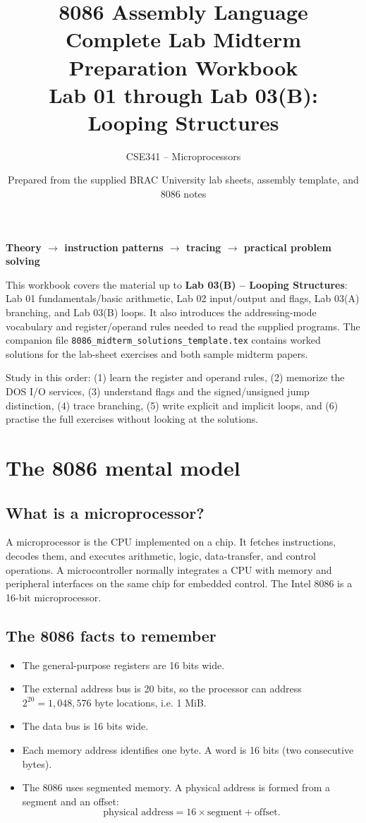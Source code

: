 \documentclass[11pt,a4paper]{article}
\title{\Huge\bfseries 8086 Assembly Language\\[3pt]\Large Complete Lab Midterm Preparation Workbook\\[5pt]\normalsize Lab 01 through Lab 03(B): Looping Structures}
\author{CSE341 -- Microprocessors}
\date{Prepared from the supplied BRAC University lab sheets, assembly template, and 8086 notes}
\begin{document}
\maketitle
\begin{center}\large\textbf{Theory $\rightarrow$ instruction patterns $\rightarrow$ tracing $\rightarrow$ practical problem solving}\end{center}
\begin{tcolorbox}[colback=navy!5,colframe=navy,title=Scope and how to use this workbook]
This workbook covers the material up to \textbf{Lab 03(B) -- Looping Structures}: Lab 01 fundamentals/basic arithmetic, Lab 02 input/output and flags, Lab 03(A) branching, and Lab 03(B) loops. It also introduces the addressing-mode vocabulary and register/operand rules needed to read the supplied programs. The companion file \texttt{8086\_midterm\_solutions\_template.tex} contains worked solutions for the lab-sheet exercises and both sample midterm papers.

Study in this order: (1) learn the register and operand rules, (2) memorize the DOS I/O services, (3) understand flags and the signed/unsigned jump distinction, (4) trace branching, (5) write explicit and implicit loops, and (6) practise the full exercises without looking at the solutions.
\end{tcolorbox}
\tableofcontents
\newpage

\section{The 8086 mental model}
\subsection{What is a microprocessor?}
A microprocessor is the CPU implemented on a chip. It fetches instructions, decodes them, and executes arithmetic, logic, data-transfer, and control operations. A microcontroller normally integrates a CPU with memory and peripheral interfaces on the same chip for embedded control. The Intel 8086 is a 16-bit microprocessor.

\subsection{The 8086 facts to remember}
\begin{itemize}
\item The general-purpose registers are 16 bits wide.
\item The external address bus is 20 bits, so the processor can address $2^{20}=1,048,576$ byte locations, i.e. 1 MiB.
\item The data bus is 16 bits wide.
\item Each memory address identifies one byte. A word is 16 bits (two consecutive bytes).
\item The 8086 uses segmented memory. A physical address is formed from a segment and an offset: \[
\text{physical address} = 16\times\text{segment} + \text{offset}.
\]
\end{itemize}
\end{document}
